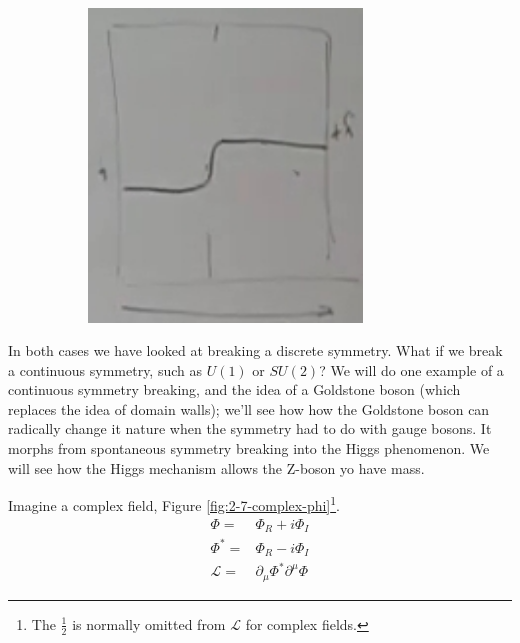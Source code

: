\documentclass[]{article}
\begin{document}
\begin{figure}[H]
\begin{subfigure}{0.9\textwidth}
\begin{center}
			\includegraphics[width=0.8\textwidth]{2-7-V-domain-wall}
		\end{center}
	\end{subfigure}
\end{figure}

In both cases we have looked at breaking a discrete symmetry. What if we break a continuous symmetry, such as $U(1)$ or $SU(2)$? We will do one example of a continuous symmetry breaking, and the idea of a Goldstone boson (which replaces the idea of domain walls); we'll see how how the Goldstone boson can radically change it nature when the symmetry had to do with gauge bosons. It morphs from spontaneous symmetry breaking into the Higgs phenomenon. We will see how the Higgs mechanism allows the Z-boson yo have mass.


Imagine a complex field, Figure \ref{fig:2-7-complex-phi}\footnote{The $\frac{1}{2}$ is normally omitted from $\mathcal{L}$ for complex fields.}.
\begin{align*}
	\Phi =& \Phi_R + i \Phi_I\\
	\Phi^* =& \Phi_R - i \Phi_I\\
	\mathcal{L} =&  \partial_\mu \Phi^* \partial^\mu \Phi 
\end{align*}
\end{document}
